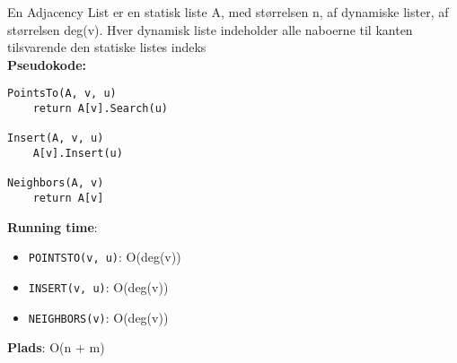 En Adjacency List er en statisk liste A, med størrelsen n, af dynamiske lister, af størrelsen deg(v). Hver dynamisk liste indeholder alle naboerne til kanten tilsvarende den statiske listes indeks\\
\textbf{Pseudokode:}
\begin{lstlisting}[frame=single, mathescape=true]
PointsTo(A, v, u)
	return A[v].Search(u)

Insert(A, v, u)
	A[v].Insert(u)

Neighbors(A, v)
	return A[v]
\end{lstlisting}
\textbf{Running time}:
\begin{itemize}
	\item \texttt{POINTSTO(v, u)}: O(deg(v))
	\item \texttt{INSERT(v, u)}: O(deg(v))
	\item \texttt{NEIGHBORS(v)}: O(deg(v))
\end{itemize}
\textbf{Plads}: O(n + m)